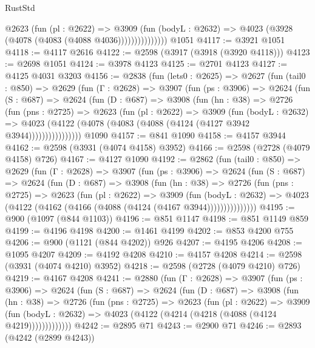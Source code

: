 \begin{lexlean}{RustStd}
\begin{coremodule}
                    @2623
                      (fun (pl : @2622) =>
                      @3909
                        (fun (bodyL : @2632) =>
                        @4023 (@3928 (@4078 (@4083 (@4088 @4036)))))))))))))))
    @1051
@4117 := @3921 @1051
@4118 := @4117 @2616
@4122 := @2598 (@3917 (@3918 (@3920 @4118)))
@4123 := @2698 @1051
@4124 := @3978 @4123
@4125 := @2701 @4123
@4127 := @4125 @4031 @3203
@4156 := @2838
    (fun (lets0 : @2625) =>
    @2627
      (fun (tail0 : @850) =>
      @2629
        (fun (Γ : @2628) =>
        @3907
          (fun (ps : @3906) =>
          @2624
            (fun (S : @687) =>
            @2624
              (fun (D : @687) =>
              @3908
                (fun (hn : @38) =>
                @2726
                  (fun (pns : @2725) =>
                  @2623
                    (fun (pl : @2622) =>
                    @3909
                      (fun (bodyL : @2632) =>
                      @4023 (@4122 (@4078 (@4083 (@4088 (@4124 (@4127 @3942 @3944))))))))))))))))
    @1090
@4157 := @841 @1090
@4158 := @4157 @3944
@4162 := @2598 (@3931 (@4074 @4158) @3952)
@4166 := @2598 (@2728 (@4079 @4158) @726)
@4167 := @4127 @1090
@4192 := @2862
    (fun (tail0 : @850) =>
    @2629
      (fun (Γ : @2628) =>
      @3907
        (fun (ps : @3906) =>
        @2624
          (fun (S : @687) =>
          @2624
            (fun (D : @687) =>
            @3908
              (fun (hn : @38) =>
              @2726
                (fun (pns : @2725) =>
                @2623
                  (fun (pl : @2622) =>
                  @3909
                    (fun (bodyL : @2632) =>
                    @4023 (@4122 (@4162 (@4166 (@4088 (@4124 (@4167 @3944)))))))))))))))
@4195 := @900 (@1097 (@844 @1103))
@4196 := @851 @1147
@4198 := @851 @1149 @859
@4199 := @4196 @4198
@4200 := @1461 @4199
@4202 := @853 @4200 @755
@4206 := @900 (@1121 (@844 @4202)) @926
@4207 := @4195 @4206
@4208 := @1095 @4207
@4209 := @4192 @4208
@4210 := @4157 @4208
@4214 := @2598 (@3931 (@4074 @4210) @3952)
@4218 := @2598 (@2728 (@4079 @4210) @726)
@4219 := @4167 @4208
@4241 := @2880
    (fun (Γ : @2628) =>
    @3907
      (fun (ps : @3906) =>
      @2624
        (fun (S : @687) =>
        @2624
          (fun (D : @687) =>
          @3908
            (fun (hn : @38) =>
            @2726
              (fun (pns : @2725) =>
              @2623
                (fun (pl : @2622) =>
                @3909
                  (fun (bodyL : @2632) =>
                  @4023 (@4122 (@4214 (@4218 (@4088 (@4124 @4219)))))))))))))
@4242 := @2895 @71
@4243 := @2900 @71
@4246 := @2893 (@4242 (@2899 @4243))

\end{coremodule}
\end{lexlean}
